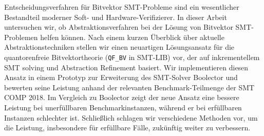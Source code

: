 
\Abstract
Entscheidungsverfahren für Bitvektor SMT-Probleme sind ein wesentlicher Bestandteil moderner Soft- und Hardware-Verifizierer.
In dieser Arbeit untersuchen wir, ob Abstraktionsverfahren bei der Lösung von Bitvektor SMT-Problemen helfen können.
Nach einem kurzen Überblick über aktuelle Abstraktionstechniken stellen wir einen neuartigen Lösungsansatz für die quantorenfreie Bitvektortheorie (\texttt{QF\_BV} in SMT-LIB) vor, der auf inkrementellem SMT solving und Abstraction Refinement basiert.
Wir implementieren diesen Ansatz in einem Prototyp zur Erweiterung des SMT-Solver Boolector und bewerten seine Leistung anhand der relevanten Benchmark-Teilmenge der SMT COMP 2018.
Im Vergleich zu Boolector zeigt der neue Ansatz eine bessere Leistung bei unerfüllbaren Benchmarkinstanzen, während er bei erfüllbaren Instanzen schlechter ist.
Schließlich schlagen wir verschiedene Methoden vor, um die Leistung, insbesondere für erfüllbare Fälle, zukünftig weiter zu verbessern.